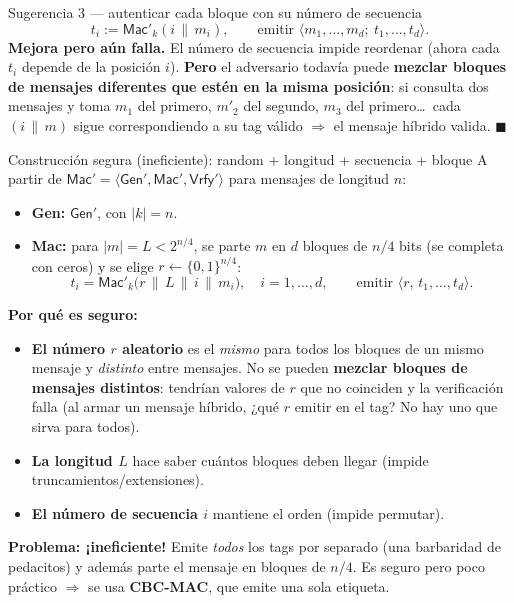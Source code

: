 \documentclass[11pt,a4paper]{article}
\newcommand{\concat}{\,\|\,}
\newcommand{\Mac}{\mathsf{Mac}}
\newcommand{\Vrfy}{\mathsf{Vrfy}}
\newcommand{\Gen}{\mathsf{Gen}}
\begin{document}
\begin{practbox}{Sugerencia 3 — autenticar cada bloque con su número de secuencia}
\[
  t_i := \Mac'_k(i\concat m_i),\qquad \text{emitir } \langle m_1,\ldots,m_d;\ t_1,\ldots,t_d\rangle.
\]
\textbf{Mejora pero aún falla.} El número de secuencia impide reordenar (ahora cada $t_i$
depende de la posición $i$). \textbf{Pero} el adversario todavía puede \textbf{mezclar
bloques de mensajes diferentes que estén en la misma posición}: si consulta dos mensajes y
toma $m_1$ del primero, $m'_2$ del segundo, $m_3$ del primero\ldots\ cada $(i\concat m)$
sigue correspondiendo a su tag válido $\Rightarrow$ el mensaje híbrido valida. $\blacksquare$
\end{practbox}

\begin{practbox}{Construcción segura (ineficiente): random + longitud + secuencia + bloque}
A partir de $\Mac'=\langle\Gen',\Mac',\Vrfy'\rangle$ para mensajes de longitud $n$:
\begin{itemize}[leftmargin=1.4em,itemsep=1pt]
  \item \textbf{Gen:} $\Gen'$, con $|k|=n$.
  \item \textbf{Mac:} para $|m|=L<2^{n/4}$, se parte $m$ en $d$ bloques de $n/4$ bits (se
        completa con ceros) y se elige $r\leftarrow\{0,1\}^{n/4}$:
        \[
          t_i = \Mac'_k\bigl(r\concat L\concat i\concat m_i\bigr),\quad i=1,\ldots,d,
          \qquad \text{emitir } \langle r,\,t_1,\ldots,t_d\rangle.
        \]
\end{itemize}
\textbf{Por qué es seguro:}
\begin{itemize}[leftmargin=1.4em,itemsep=1pt]
  \item \textbf{El número $r$ aleatorio} es el \emph{mismo} para todos los bloques de un mismo
        mensaje y \emph{distinto} entre mensajes. No se pueden \textbf{mezclar bloques de
        mensajes distintos}: tendrían valores de $r$ que no coinciden y la verificación falla
        (al armar un mensaje híbrido, ¿qué $r$ emitir en el tag? No hay uno que sirva para
        todos).
  \item \textbf{La longitud $L$} hace saber cuántos bloques deben llegar (impide
        truncamientos/extensiones).
  \item \textbf{El número de secuencia $i$} mantiene el orden (impide permutar).
\end{itemize}
\textbf{Problema: ¡ineficiente!} Emite \emph{todos} los tags por separado (una barbaridad de
pedacitos) y además parte el mensaje en bloques de $n/4$. Es seguro pero poco práctico
$\Rightarrow$ se usa \textbf{CBC-MAC}, que emite una sola etiqueta.
\end{practbox}
\end{document}

